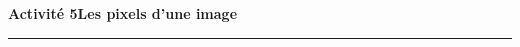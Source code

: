 \documentclass[a4paper]{article}
\newlength{\stextwidth} %
\newcommand{\guess}[1]{\ifthenelse{\boolean{reveal}}{{\color{red}#1}}{\settowidth{\stextwidth}{#1}\makebox[\stextwidth]{\dotfill}}}
\begin{document}
%
%
%
%

\noindent\textbf{Activité 5}\hfill{}\textbf{Les pixels d'une image}
\smallskip
\hrule
\medskip
\end{document}
